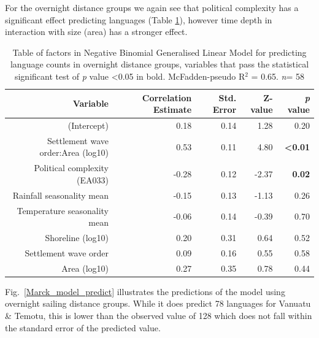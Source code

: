 \documentclass[a4paper,10pt]{article} %
\begin{document}
For the overnight distance groups we again see that political complexity has a significant effect predicting languages (Table \ref{table:GLM_model_marck}), however time depth in interaction with size (area) has a stronger effect.

\begin{table}%
\centering
\begin{tabular}{rrrrr}
  \hline
Variable & Correlation Estimate & Std. Error & Z-value & \emph{p} value \\ 
  \hline
(Intercept) & 0.18 & 0.14 & 1.28 & 0.20 \\ 
Settlement wave order:Area (log10) & 0.53 & 0.11 & 4.80 &   \textbf{<0.01} \\   
Political complexity (EA033) & -0.28 & 0.12 & -2.37 & \textbf{0.02} \\ 
Rainfall seasonality mean & -0.15 & 0.13 & -1.13 & 0.26 \\ 
Temperature seasonality mean & -0.06 & 0.14 & -0.39 & 0.70 \\ 
Shoreline (log10) & 0.20 & 0.31 & 0.64 & 0.52 \\ 
Settlement wave order & 0.09 & 0.16 & 0.55 & 0.58 \\ 
Area (log10)& 0.27 & 0.35 & 0.78 & 0.44 \\ 
 \hline
\end{tabular}
\caption[Table of factors in Negative Binomial Generalised Linear Model for predicting language counts in overnight distance groups.]{Table of factors in Negative Binomial Generalised Linear Model for predicting language counts in overnight distance groups, variables that pass the statistical significant test of \emph{p} value <0.05 in bold. McFadden-pseudo R$^2$ = 0.65.  \emph{n}= 58} 
\label{table:GLM_model_marck}
\end{table}

Fig.~\ref{Marck_model_predict} illustrates the predictions of the model using overnight sailing distance groups. While it does predict 78 languages for Vanuatu \& Temotu, this is lower than the observed value of 128 which does not fall within the standard error of the predicted value.
\end{document}
